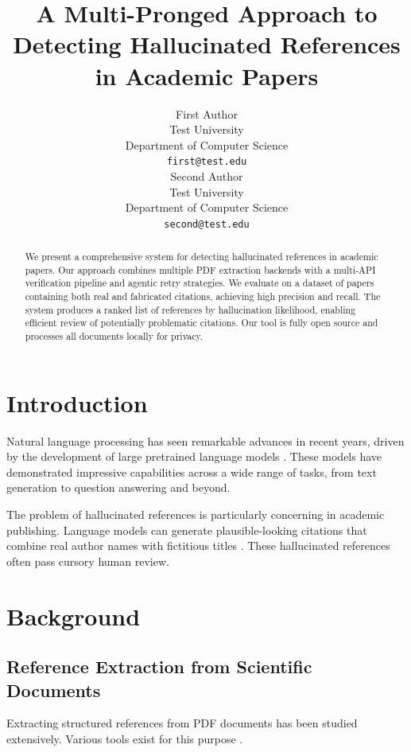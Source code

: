 \documentclass[11pt]{article}
\title{A Multi-Pronged Approach to Detecting Hallucinated References in Academic Papers}
\author{First Author \\
  Test University \\
  Department of Computer Science \\
  \texttt{first@test.edu} \\\And
  Second Author \\
  Test University \\
  Department of Computer Science \\
  \texttt{second@test.edu} \\}
\begin{document}
\maketitle

\begin{abstract}
We present a comprehensive system for detecting hallucinated references in academic papers. Our approach combines multiple PDF extraction backends with a multi-API verification pipeline and agentic retry strategies. We evaluate on a dataset of papers containing both real and fabricated citations, achieving high precision and recall. The system produces a ranked list of references by hallucination likelihood, enabling efficient review of potentially problematic citations. Our tool is fully open source and processes all documents locally for privacy.
\end{abstract}

\section{Introduction}

Natural language processing has seen remarkable advances in recent years, driven by the development of large pretrained language models \cite{devlin-etal-2019-bert,vaswani-etal-2017-attention,brown-etal-2020-language}. These models have demonstrated impressive capabilities across a wide range of tasks, from text generation to question answering and beyond.

\lipsum[1-3]

The problem of hallucinated references is particularly concerning in academic publishing. Language models can generate plausible-looking citations that combine real author names with fictitious titles \cite{chang-etal-2019-bert-hallucinated,zhang-etal-2023-adaptive}. These hallucinated references often pass cursory human review.

\lipsum[4-5]

\section{Background}

\subsection{Reference Extraction from Scientific Documents}

Extracting structured references from PDF documents has been studied extensively. Various tools exist for this purpose \cite{wolf-etal-2020-transformers,vaswani-etal-2019-attention-hallucinated}.
\end{document}
